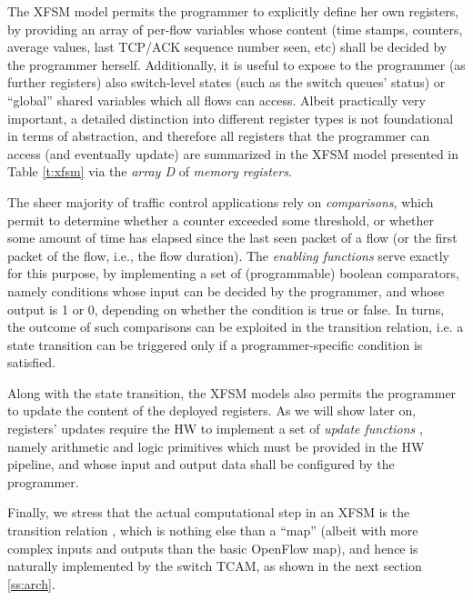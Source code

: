 \documentclass{sig-alternate}
\begin{document}
\vspace{3pt}  The XFSM model permits the programmer to explicitly define her own registers, by providing an array of per-flow variables whose content (time stamps, counters, average values, last TCP/ACK sequence number seen, etc) shall be decided by the programmer herself. Additionally, it is useful to expose to the programmer (as further registers) also switch-level states (such as the switch queues' status) or ``global'' shared variables which all flows can access. Albeit practically very important, a detailed distinction into different register types is not foundational in terms of abstraction, and therefore all registers that the programmer can access (and eventually update) are summarized in the XFSM model presented in Table \ref{t:xfsm} via the {\em array D} of {\em memory registers}.

\vspace{3pt}  The sheer majority of traffic control applications rely on {\em comparisons}, which permit to determine whether a counter exceeded some threshold, or whether some amount of time has elapsed since the last seen packet of a flow (or the first packet of the flow, i.e., the flow duration). The {\em enabling functions}  serve exactly for this purpose, by implementing a set of (programmable) boolean comparators, namely conditions whose input can be decided by the programmer, and whose output is 1 or 0, depending on whether the condition is true or false. In turns, the outcome of such comparisons can be exploited in the transition relation, i.e. a state transition can be triggered only if a programmer-specific condition is satisfied. 

\vspace{3pt}  Along with the state transition, the XFSM models also permits the programmer to update the content of the deployed registers. As we will show later on, registers'  updates require the HW to implement a set of {\em update functions} , namely arithmetic and logic primitives which must be provided in the HW pipeline, and whose input and output data shall be configured by the programmer.

\vspace{3pt} Finally, we stress that the actual computational step in an XFSM is the transition relation , which is nothing else than a ``map'' (albeit with more complex inputs and outputs than the basic OpenFlow map), and hence is naturally implemented by the switch TCAM, as shown in the next section \ref{ss:arch}.
\end{document}
